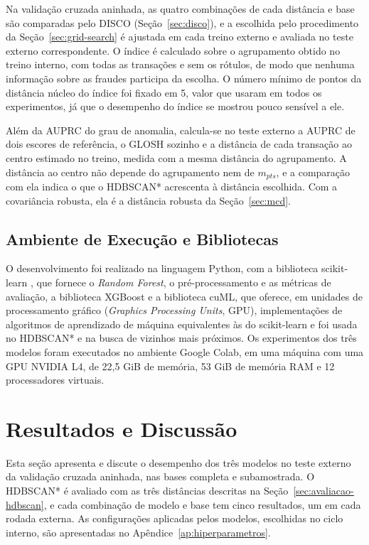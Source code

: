 \documentclass{uflamon}          %
\begin{document}
Na validação cruzada aninhada, as quatro combinações de cada distância e base são comparadas pelo DISCO (Seção~\ref{sec:disco}), e a escolhida pelo procedimento da Seção~\ref{sec:grid-search} é ajustada em cada treino externo e avaliada no teste externo correspondente. O índice é calculado sobre o agrupamento obtido no treino interno, com todas as transações e sem os rótulos, de modo que nenhuma informação sobre as fraudes participa da escolha. O número mínimo de pontos da distância núcleo do índice foi fixado em 5, valor que  usaram em todos os experimentos, já que o desempenho do índice se mostrou pouco sensível a ele.

Além da AUPRC do grau de anomalia, calcula-se no teste externo a AUPRC de dois escores de referência, o GLOSH sozinho e a distância de cada transação ao centro estimado no treino, medida com a mesma distância do agrupamento. A distância ao centro não depende do agrupamento nem de $m_{pts}$, e a comparação com ela indica o que o HDBSCAN* acrescenta à distância escolhida. Com a covariância robusta, ela é a distância robusta da Seção~\ref{sec:mcd}.

\section{Ambiente de Execução e Bibliotecas}

O desenvolvimento foi realizado na linguagem Python, com a biblioteca scikit-learn \cite{pedregosa2011}, que fornece o \textit{Random Forest}, o pré-processamento e as métricas de avaliação, a biblioteca XGBoost \cite{chen2016} e a biblioteca cuML, que oferece, em unidades de processamento gráfico (\textit{Graphics Processing Units}, GPU), implementações de algoritmos de aprendizado de máquina equivalentes às do scikit-learn \cite{raschka2020} e foi usada no HDBSCAN* e na busca de vizinhos mais próximos. Os experimentos dos três modelos foram executados no ambiente Google Colab, em uma máquina com uma GPU NVIDIA L4, de 22,5 GiB de memória, 53 GiB de memória RAM e 12 processadores virtuais.

\chapter{Resultados e Discussão}
\label{cap:resultados}

Esta seção apresenta e discute o desempenho dos três modelos no teste externo da validação cruzada aninhada, nas bases completa e subamostrada. O HDBSCAN* é avaliado com as três distâncias descritas na Seção~\ref{sec:avaliacao-hdbscan}, e cada combinação de modelo e base tem cinco resultados, um em cada rodada externa. As configurações aplicadas pelos modelos, escolhidas no ciclo interno, são apresentadas no Apêndice~\ref{ap:hiperparametros}.
\end{document}
